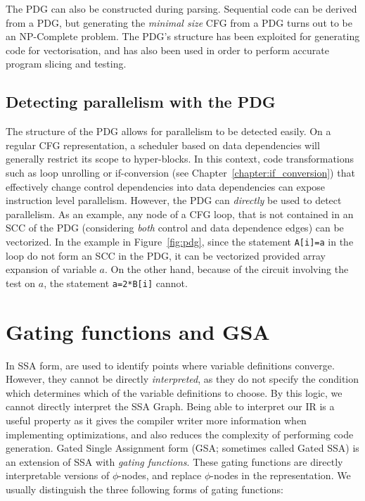 The PDG can also be constructed during parsing. Sequential code can be derived from a PDG, but generating the {\it minimal size} CFG from a PDG turns out to be an NP-Complete problem.
The PDG's structure has been exploited for generating code for vectorisation, and has also been used in order to perform accurate program slicing and testing.

\subsection{Detecting parallelism with the PDG}

The structure of the PDG allows for parallelism to be detected easily. On a regular CFG representation, a scheduler based on data dependencies will generally restrict its scope to hyper-blocks. In this context, code transformations such as loop unrolling or if-conversion (see Chapter~\ref{chapter:if_conversion}) that effectively change control dependencies into data dependencies can expose instruction level parallelism.  However, the PDG can \textit{directly} be used to detect parallelism. As an example, any node of a CFG loop, that is not contained in an SCC of the PDG (considering \textit{both} control and data dependence edges) can be vectorized. In the example in Figure~\ref{fig:pdg}, since the statement \texttt{A[i]=a} in the loop do not form an SCC in the PDG, it can be vectorized provided array expansion of variable $a$. On the other hand, because of the circuit involving the test on $a$, the statement \texttt{a=2*B[i]} cannot.


\section{Gating functions and GSA}
\label{sec:gating_functions}

In SSA form, \phifuns are used to identify points where variable definitions converge. However, they cannot be directly \textit{interpreted}, as they do not specify the condition which determines which of the variable definitions to choose. By this logic, we cannot directly interpret the SSA Graph. Being able to interpret our IR is a useful property as it gives the compiler writer more information when implementing optimizations, and also reduces the complexity of performing code generation. Gated Single Assignment form (GSA; sometimes called Gated SSA) is an extension of SSA with \textit{gating functions}. These gating functions are directly interpretable versions of $\phi$-nodes, and replace $\phi$-nodes in the representation. We usually distinguish the three following forms of gating functions:

